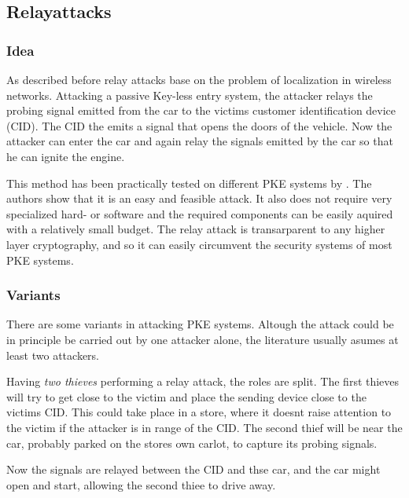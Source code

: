 
\subsection{Relayattacks}
\label{sec:relayAttacks}
\subsubsection*{Idea}
	As described before relay attacks base on the problem of localization in
	wireless networks.
	Attacking a passive Key-less entry system,
	the attacker relays the probing signal emitted from the car to the victims
	customer identification device (CID).
	The CID the emits a signal that opens the doors of the vehicle.
	Now the attacker can enter the car and again relay the signals emitted by the
	car so that he can ignite the engine.
	
	This method has been practically tested on different PKE systems by \cite{relayAttacksFranc}. %
	The authors show that it is an easy and feasible attack.
	It also does not require very specialized hard- or software and
	the required components can be easily aquired with a relatively small budget.
	The relay attack is transarparent to any higher layer cryptography,	%
	and so it can easily circumvent the security systems of most PKE systems.

\subsubsection*{Variants}
	There are some variants in attacking PKE systems.
	Altough the attack could be in principle be carried out by one attacker alone,
	the literature usually asumes at least two attackers.

	\label{par:twoThieves}
	Having \textsl{two thieves} performing a relay attack,
	the roles are split.
	The first thieves will try to get close to the victim and place
	the sending device close to the victims CID.
	This could take place in a store,
	where it doesnt raise attention to the victim if the attacker
	is in range of the CID.
	The second thief will be near the car,
	probably parked on the stores own carlot,
	to capture its probing signals.

	Now the signals are relayed between the CID and thse car,
	and the car might open and start,
	allowing the second thiee to drive away.
	

